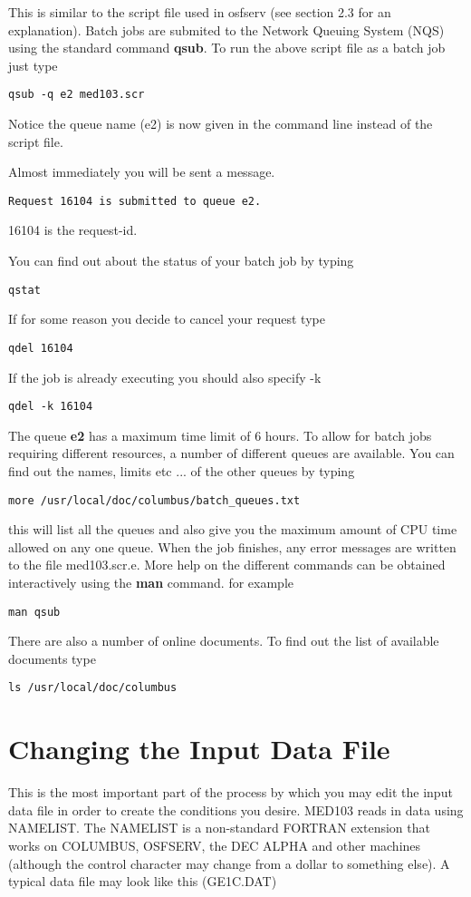 This is similar to the script file used in osfserv (see section 2.3 for an explanation).
Batch jobs are submited to the  Network Queuing System (NQS) using the standard
command {\bf qsub}.
To run the above script file as a batch job just type
\begin{verbatim}
qsub -q e2 med103.scr
\end{verbatim}
Notice the queue name (e2) is now given in the command line instead of the
script file. 

Almost immediately you will be sent a message.
\begin{verbatim}
Request 16104 is submitted to queue e2.
\end{verbatim}
16104 is the request-id.

You can find out about the status of your batch job by typing
\begin{verbatim}
qstat
\end{verbatim}
If for some reason you decide to cancel your request 
type
\begin{verbatim}
qdel 16104
\end{verbatim}
If the job is already executing you should also specify -k
\begin{verbatim}
qdel -k 16104
\end{verbatim}
The queue {\bf e2} has a maximum time limit of 6 hours.
To allow for batch jobs requiring different resources,
a number of different queues are available.
You can  find out the names, limits etc ...  of the other queues by
typing
\begin{verbatim}
more /usr/local/doc/columbus/batch_queues.txt
\end{verbatim}
this will list all the queues and also give
you the maximum amount of CPU time allowed on any one queue.
When the job finishes, any error messages are written to 
the file med103.scr.e.
More help on the different commands can be obtained interactively using the {\bf man} command. for example
\begin{verbatim}
man qsub
\end{verbatim}
There are also a number of online documents. To find out the list of
available documents type
\begin{verbatim}
ls /usr/local/doc/columbus
\end{verbatim}
                                                                                          
\newpage
\section{Changing the Input Data File}
This is the most important part of the process by which you may edit
the input data file in order to create the conditions you desire.
MED103 reads in data using NAMELIST.
The NAMELIST is a non-standard FORTRAN extension that works on COLUMBUS, 
OSFSERV, the DEC ALPHA and other machines (although the control
character may change from a dollar to something else). 
A typical data file may look like this (GE1C.DAT)

